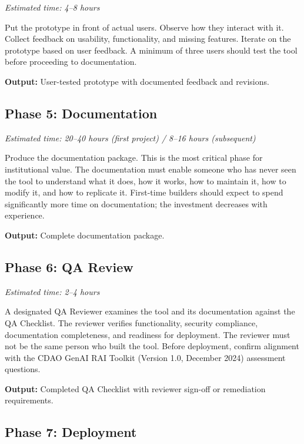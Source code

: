 \documentclass[11pt,letterpaper]{article}
\begin{document}
\noindent\textit{Estimated time: 4--8 hours}

Put the prototype in front of actual users. Observe how they interact with it.
Collect feedback on usability, functionality, and missing features. Iterate on
the prototype based on user feedback. A minimum of three users should test the
tool before proceeding to documentation.

\textbf{Output:} User-tested prototype with documented feedback and revisions.

\subsection{Phase 5: Documentation}
\label{sec:phase-5}

\noindent\textit{Estimated time: 20--40 hours (first project) / 8--16 hours (subsequent)}

Produce the documentation package. This is the most critical phase for institutional
value. The documentation must enable someone who has never seen the tool to understand
what it does, how it works, how to maintain it, how to modify it, and how to
replicate it. First-time builders should expect to spend significantly more time
on documentation; the investment decreases with experience.

\textbf{Output:} Complete documentation package.

\subsection{Phase 6: QA Review}
\label{sec:phase-6}

\noindent\textit{Estimated time: 2--4 hours}

A designated QA Reviewer examines the tool and its documentation against the
QA Checklist. The reviewer verifies functionality, security compliance,
documentation completeness, and readiness for deployment. The reviewer must
not be the same person who built the tool. Before deployment, confirm alignment
with the CDAO GenAI RAI Toolkit (Version 1.0, December 2024) assessment questions.

\textbf{Output:} Completed QA Checklist with reviewer sign-off or remediation requirements.

\subsection{Phase 7: Deployment}
\label{sec:phase-7}
\end{document}
